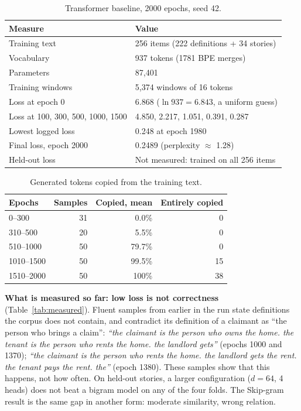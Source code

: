 \documentclass[letterpaper, 10pt, conference]{IEEEtran}
\begin{document}
\begin{table}[t]
\caption{Transformer baseline, 2000 epochs, seed 42.}\label{tab:tf}
\centering\footnotesize\setlength{\tabcolsep}{3pt}
\begin{tabular}{@{}lL{4.6cm}@{}}
\toprule
Measure & Value\\
\midrule
Training text & 256 items (222 definitions + 34 stories)\\
Vocabulary & 937 tokens (1781 BPE merges)\\
Parameters & 87,401\\
Training windows & 5,374 windows of 16 tokens\\
Loss at epoch 0 & 6.868 ($\ln 937=6.843$, a uniform guess)\\
Loss at 100, 300, 500, 1000, 1500 & 4.850, 2.217, 1.051, 0.391, 0.287\\
Lowest logged loss & 0.248 at epoch 1980\\
Final loss, epoch 2000 & 0.2489 (perplexity $\approx$ 1.28)\\
Held-out loss & Not measured: trained on all 256 items\\
\bottomrule
\end{tabular}
\end{table}

\begin{table}[t]
\caption{Generated tokens copied from the training text.}\label{tab:copy}
\centering\footnotesize\setlength{\tabcolsep}{4pt}
\begin{tabular}{@{}lrrr@{}}
\toprule
Epochs & Samples & Copied, mean & Entirely copied\\
\midrule
0--300 & 31 & 0.0\% & 0\\
310--500 & 20 & 5.5\% & 0\\
510--1000 & 50 & 79.7\% & 0\\
1010--1500 & 50 & 99.5\% & 15\\
1510--2000 & 50 & 100\% & 38\\
\bottomrule
\end{tabular}
\end{table}

\textbf{What is measured so far: low loss is not correctness} (Table~\ref{tab:measured}). Fluent samples from earlier in the run state definitions the corpus does not contain, and contradict its definition of a claimant as ``the person who brings a claim'': \emph{``the claimant is the person who owns the home. the tenant is the person who rents the home. the landlord gets''} (epochs 1000 and 1370); \emph{``the claimant is the person who rents the home. the landlord gets the rent. the tenant pays the rent. the''} (epoch 1380). These samples show that this happens, not how often. On held-out stories, a larger configuration ($d{=}64$, 4 heads) does not beat a bigram model on any of the four folds. The Skip-gram result is the same gap in another form: moderate similarity, wrong relation.
\end{document}
